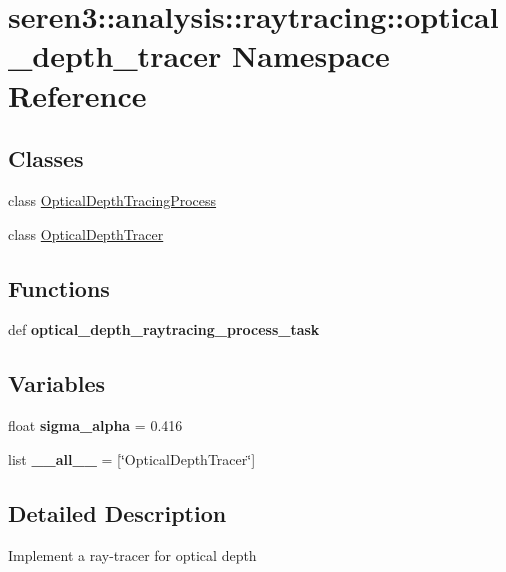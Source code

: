 \hypertarget{namespaceseren3_1_1analysis_1_1raytracing_1_1optical__depth__tracer}{
\section{seren3::analysis::raytracing::optical\_\-depth\_\-tracer Namespace Reference}
\label{namespaceseren3_1_1analysis_1_1raytracing_1_1optical__depth__tracer}
}
\subsection*{Classes}
\begin{DoxyCompactItemize}
\item 
class \hyperlink{classseren3_1_1analysis_1_1raytracing_1_1optical__depth__tracer_1_1OpticalDepthTracingProcess}{OpticalDepthTracingProcess}
\item 
class \hyperlink{classseren3_1_1analysis_1_1raytracing_1_1optical__depth__tracer_1_1OpticalDepthTracer}{OpticalDepthTracer}
\end{DoxyCompactItemize}
\subsection*{Functions}
\begin{DoxyCompactItemize}
\item 
\hypertarget{namespaceseren3_1_1analysis_1_1raytracing_1_1optical__depth__tracer_afe9fe6301be646585c87f8b8c6e78d30}{
def {\bfseries optical\_\-depth\_\-raytracing\_\-process\_\-task}}
\label{namespaceseren3_1_1analysis_1_1raytracing_1_1optical__depth__tracer_afe9fe6301be646585c87f8b8c6e78d30}

\end{DoxyCompactItemize}
\subsection*{Variables}
\begin{DoxyCompactItemize}
\item 
\hypertarget{namespaceseren3_1_1analysis_1_1raytracing_1_1optical__depth__tracer_a3be28634cd661458a8d9e3837e199347}{
float {\bfseries sigma\_\-alpha} = 0.416}
\label{namespaceseren3_1_1analysis_1_1raytracing_1_1optical__depth__tracer_a3be28634cd661458a8d9e3837e199347}

\item 
\hypertarget{namespaceseren3_1_1analysis_1_1raytracing_1_1optical__depth__tracer_af36c50a142040d9193d0353e25743f60}{
list {\bfseries \_\-\_\-all\_\-\_\-} = \mbox{[}\char`\"{}OpticalDepthTracer\char`\"{}\mbox{]}}
\label{namespaceseren3_1_1analysis_1_1raytracing_1_1optical__depth__tracer_af36c50a142040d9193d0353e25743f60}

\end{DoxyCompactItemize}


\subsection{Detailed Description}
\begin{DoxyVerb}
Implement a ray-tracer for optical depth
\end{DoxyVerb}
 
